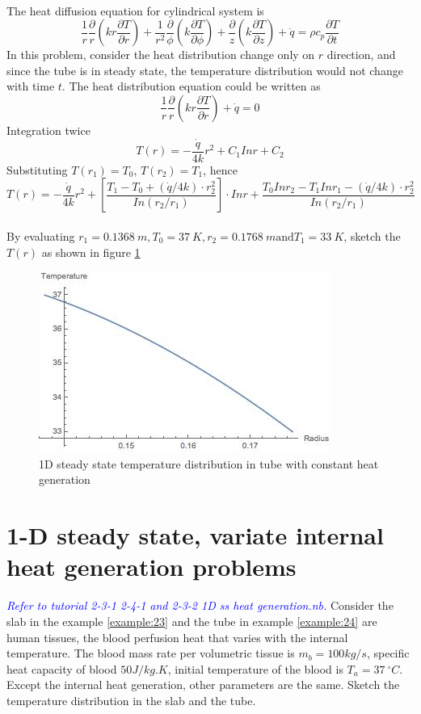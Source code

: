 \begin{solution}
~\\
The heat diffusion equation for cylindrical system is 
$$ 
\frac{1}{r}\frac{\partial}{r}(kr\frac{\partial T}{\partial r})+
\frac{1}{r^2}\frac{\partial}{\phi}(k\frac{\partial T}{\partial \phi})+
\frac{\partial}{z}(k\frac{\partial T}{\partial z})+
\dot{q} =
\rho c_p\frac{\partial T}{\partial t}
$$
In this problem, consider the heat distribution change only on $r$ direction,
and since the tube is in steady state, the temperature distribution would not
change with time $t$. The heat distribution equation could be written as
$$\frac{1}{r}\frac{\partial}{r}(kr\frac{\partial T}{\partial r})+\dot{q}=0$$
Integration twice
$$T(r)=-\frac{\dot{q}}{4k}r^2+C_1Inr+C_2$$
Substituting $T(r_1)=T_0$, $T(r_2)=T_1$, hence
$$
T(r)=-\frac{\dot{q}}{4k}r^2 +\left[\frac{T_1-T_0+(\dot{q}/4k)\cdot r_2^2}{In(r_2/r_1)} \right]\cdot Inr +
\frac{T_0Inr_2-T_1Inr_1-(\dot{q}/4k)\cdot r_2^2}{In(r_2/r_1)}
$$
~\\
By evaluating $r_1=0.1368~m, T_0=37~K, r_2=0.1768~m \text{and} T_1=33~K$,
sketch the $T(r)$ as shown in figure \ref{fig:2:9}
\begin{figure}[h!]
  \centering
    \includegraphics[scale=1]{figures/ch2/9}
    \caption{1D steady state temperature distribution in tube with constant heat generation}
    \label{fig:2:9}
\end{figure}
\end{solution}

\section{1-D steady state, variate internal	heat generation	problems}
\begin{example}
\textcolor{blue} {\emph{Refer to tutorial 2-3-1 2-4-1 and 2-3-2 1D ss heat generation.nb.}}
Consider the slab in the example \ref{example:23} and the tube in example
\ref{example:24} are human tissues, the blood perfusion heat that varies with the internal temperature. The blood mass rate per volumetric tissue is $m_b=100kg/s$, specific heat capacity of blood $50J/kg.K$, initial temperature of the blood is 
$T_a=37~^\circ C$. Except the internal heat generation, other parameters are the same. 
Sketch the temperature distribution in the slab and the tube.
\end{example}

